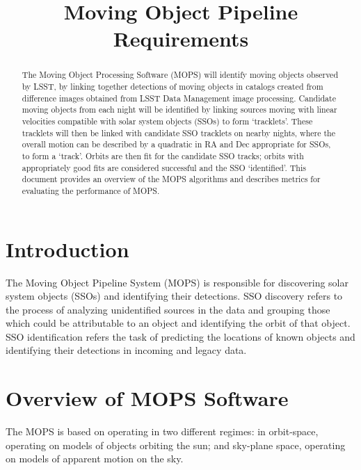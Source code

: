 \documentclass[12pt,preprint]{aastex}
\begin{document}
\title{Moving Object Pipeline Requirements}

\author{}

\begin{abstract}

The Moving Object Processing Software (MOPS) will identify moving
objects observed by LSST, by linking together detections of moving
objects in catalogs created from difference images obtained from LSST
Data Management image processing. Candidate moving objects from each
night will be identified by linking sources moving with linear
velocities compatible with solar system objects (SSOs) to form
`tracklets'. These tracklets will then be linked with candidate SSO
tracklets on nearby nights, where the overall motion can be described
by a quadratic in RA and Dec appropriate for SSOs, to form a
`track'.  Orbits are then fit for the candidate SSO tracks; orbits
with appropriately good fits are considered successful and the SSO
`identified'.  This document provides an overview of the MOPS
algorithms and describes metrics for evaluating the performance of
MOPS.

\end{abstract}

\tableofcontents


\section{Introduction}

The Moving Object Pipeline System (MOPS) is responsible for
discovering solar system objects (SSOs) and identifying their
detections.  SSO discovery refers to the process of analyzing
unidentified sources in the data and grouping those which could be
attributable to an object and identifying the orbit of that object.
SSO identification refers the task of predicting the locations of
known objects and identifying their detections in incoming and legacy
data.

 
\section{Overview of MOPS Software}

The MOPS is based on operating in two different regimes: in
orbit-space, operating on models of objects orbiting the sun; and
sky-plane space, operating on models of apparent motion on the sky.
\end{document}
